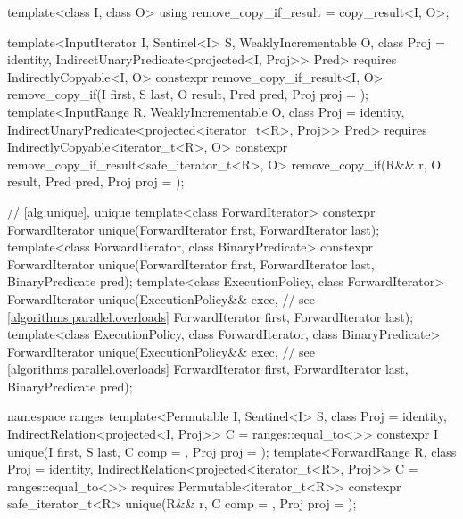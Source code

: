 \begin{codeblock}
{{    template<class I, class O>
    using remove_copy_if_result = copy_result<I, O>;

    template<InputIterator I, Sentinel<I> S, WeaklyIncrementable O,
             class Proj = identity, IndirectUnaryPredicate<projected<I, Proj>> Pred>
      requires IndirectlyCopyable<I, O>
      constexpr remove_copy_if_result<I, O>
        remove_copy_if(I first, S last, O result, Pred pred, Proj proj = {});
    template<InputRange R, WeaklyIncrementable O, class Proj = identity,
             IndirectUnaryPredicate<projected<iterator_t<R>, Proj>> Pred>
      requires IndirectlyCopyable<iterator_t<R>, O>
      constexpr remove_copy_if_result<safe_iterator_t<R>, O>
        remove_copy_if(R&& r, O result, Pred pred, Proj proj = {});
  }

  // \ref{alg.unique}, unique
  template<class ForwardIterator>
    constexpr ForwardIterator unique(ForwardIterator first, ForwardIterator last);
  template<class ForwardIterator, class BinaryPredicate>
    constexpr ForwardIterator unique(ForwardIterator first, ForwardIterator last,
                                     BinaryPredicate pred);
  template<class ExecutionPolicy, class ForwardIterator>
    ForwardIterator unique(ExecutionPolicy&& exec, // see \ref{algorithms.parallel.overloads}
                           ForwardIterator first, ForwardIterator last);
  template<class ExecutionPolicy, class ForwardIterator, class BinaryPredicate>
    ForwardIterator unique(ExecutionPolicy&& exec, // see \ref{algorithms.parallel.overloads}
                           ForwardIterator first, ForwardIterator last,
                           BinaryPredicate pred);

  namespace ranges {
    template<Permutable I, Sentinel<I> S, class Proj = identity,
             IndirectRelation<projected<I, Proj>> C = ranges::equal_to<>>
      constexpr I unique(I first, S last, C comp = {}, Proj proj = {});
    template<ForwardRange R, class Proj = identity,
             IndirectRelation<projected<iterator_t<R>, Proj>> C = ranges::equal_to<>>
      requires Permutable<iterator_t<R>>
      constexpr safe_iterator_t<R>
        unique(R&& r, C comp = {}, Proj proj = {});
  }

}
\end{codeblock}
